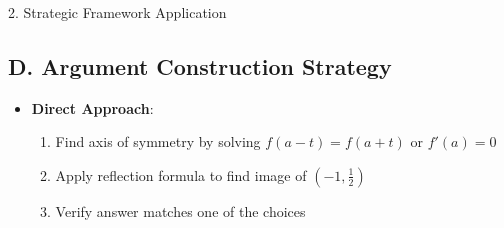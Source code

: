 \documentclass[12pt]{article}
\begin{document}
\begin{strategybox}{2. Strategic Framework Application}
\subsection*{D. Argument Construction Strategy}
\begin{itemize}[leftmargin=*]
    \item \textbf{Direct Approach}: 
    \begin{enumerate}
        \item Find axis of symmetry by solving $f(a-t) = f(a+t)$ or $f'(a) = 0$
        \item Apply reflection formula to find image of $(-1, \frac{1}{2})$
        \item Verify answer matches one of the choices
    \end{enumerate}
\end{itemize}

\end{strategybox}
\end{document}
